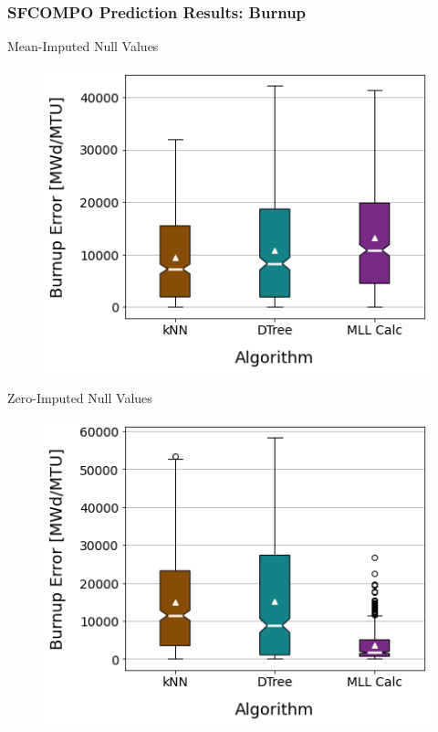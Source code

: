 \begin{frame}
  \frametitle{SFCOMPO Prediction Results: Burnup}
  \begin{adjustwidth}{-15pt}{0pt}
  \begin{minipage}{0.5\textwidth}
    \begin{block}{Mean-Imputed Null Values}
      \begin{figure}
        \centering
        \includegraphics[width=\textwidth]{./figures/sfcompo_boxplots_impnull_burn.png}
      \end{figure}
    \end{block}
  \end{minipage}%
  \hfill
  \begin{minipage}{0.5\textwidth}
    \begin{block}{Zero-Imputed Null Values}
      \begin{figure}
        \centering
        \includegraphics[width=\textwidth]{./figures/sfcompo_boxplots_0null_burn.png}
      \end{figure}
    \end{block}
  \end{minipage}
  \end{adjustwidth}
\end{frame}

